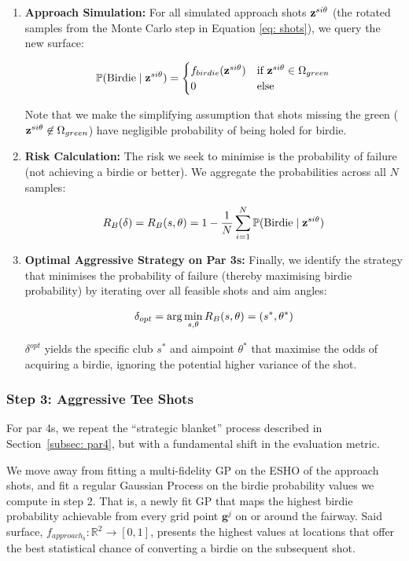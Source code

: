 \documentclass[11pt, letterpaper]{article}
\begin{document}
\begin{enumerate}
\item \textbf{Approach Simulation:} For all simulated approach shots $\mathbf{z}^{si\theta}$ (the rotated samples from the Monte Carlo step in Equation \eqref{eq: shots}), we query the new surface:

\[
\mathbb{P}(\text{Birdie} \mid \mathbf{z}^{si\theta}) = \begin{cases}
    f_{birdie}(\mathbf{z}^{si\theta}) & \text{if } \mathbf{z}^{si\theta} \in \Omega_{green} \\
    0 & \text{else}
\end{cases}
\]

Note that we make the simplifying assumption that shots missing the green ($\mathbf{z}^{si\theta} \not\in \Omega_{green}$) have negligible probability of being holed for birdie.

\item \textbf{Risk Calculation:} The risk we seek to minimise is the probability of failure (not achieving a birdie or better). We  aggregate the probabilities across all $N$ samples:

$$R_{B}(\delta)= R_{B}(s, \theta) = 1 - \frac{1}{N} \sum_{i=1}^{N} \mathbb{P}(\text{Birdie} \mid \mathbf{z}^{si\theta})$$

\item \textbf{Optimal Aggressive Strategy on Par 3s:} Finally, we identify the strategy that minimises the probability of failure (thereby maximising birdie probability) by iterating over all feasible shots and aim angles:

$$\delta_{opt} = \arg \min_{s, \theta} R_B(s, \theta) = (s^*, \theta^*)$$

$\delta^{opt}$ yields the specific club $s^*$ and aimpoint $\theta^*$ that maximise the odds of acquiring a birdie, ignoring the potential higher variance of the shot.
\end{enumerate}

\subsubsection{Step 3: Aggressive Tee Shots}

For par 4s, we repeat the ``strategic blanket'' process described in Section~\ref{subsec: par4}, but with a fundamental shift in the evaluation metric.

We move away from fitting a multi-fidelity GP on the ESHO of the approach shots, and fit a regular Gaussian Process on the birdie probability values we compute in step 2. That is, a newly fit GP that maps the highest birdie probability achievable from every grid point $\mathbf{g}^j$ on or around the fairway. Said surface, $f_{approach_b}: \mathbb{R}^2 \to [0,1]$, presents the highest values at locations that offer the best statistical chance of converting a birdie on the subsequent shot.
\end{document}
